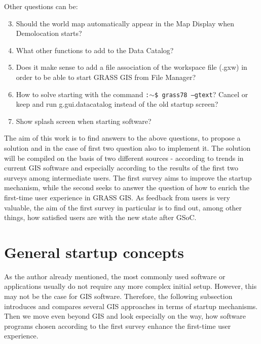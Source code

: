 \documentclass[a4paper,10pt,twoside]{article}
\begin{document}
\noindent Other questions can be:

\begin{enumerate}
\setcounter{enumi}{2}

 \item \noindent Should the world map automatically appear in the Map Display when Demolocation starts?
 
 \item \noindent What other functions to add to the Data Catalog?
 
  \item \noindent Does it make sense to add a file association of the workspace file (.gxw) in order to be able to start GRASS GIS from File Manager?
  
 \item \noindent How to solve starting with the command \texttt{:$\sim$\$ grass78 --gtext}? Cancel or keep and run g.gui.datacatalog instead of the old startup screen?
 
 \item \noindent Show splash screen when starting software?
\end{enumerate}

\noindent The aim of this work is to find answers to the above questions, to propose a solution and in the case of first two question also to implement it. The solution will be compiled on the basis of two different sources - according to trends in current GIS software and especially according to the results of the first two surveys among intermediate users. The first survey aims to improve the startup mechanism, while the second seeks to answer the question of how to enrich the first-time user experience in GRASS GIS. As feedback from users is very valuable, the aim of the first survey in particular is to find out, among other things, how satisfied users are with the new state after GSoC.


\newpage
\vspace*{-1cm}
\section{General startup concepts}
\label{sec:startup_concepts}
\noindent
\large
As the author already mentioned, the most commonly used software or applications usually do not require any more complex initial setup. However, this may not be the case for GIS software. Therefore, the following subsection introduces and compares several GIS approaches in terms of startup mechanisms. Then we move even beyond GIS and look especially on the way, how software programs chosen according to the first survey enhance the first-time user experience.
\end{document}
